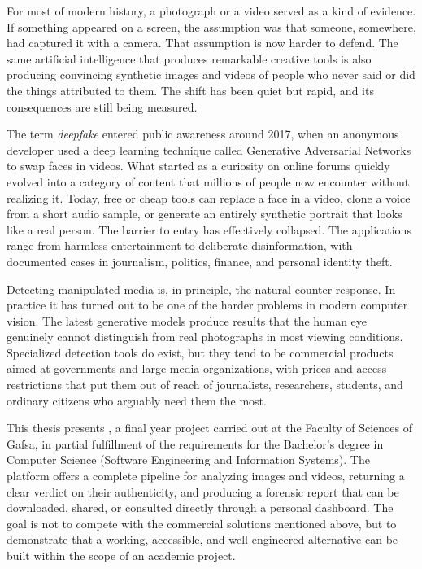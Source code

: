 
For most of modern history, a photograph or a video served as a kind of evidence. If something appeared on a screen, the assumption was that someone, somewhere, had captured it with a camera. That assumption is now harder to defend. The same artificial intelligence that produces remarkable creative tools is also producing convincing synthetic images and videos of people who never said or did the things attributed to them. The shift has been quiet but rapid, and its consequences are still being measured.

The term \textit{deepfake} entered public awareness around 2017, when an anonymous developer used a deep learning technique called Generative Adversarial Networks to swap faces in videos. What started as a curiosity on online forums quickly evolved into a category of content that millions of people now encounter without realizing it. Today, free or cheap tools can replace a face in a video, clone a voice from a short audio sample, or generate an entirely synthetic portrait that looks like a real person. The barrier to entry has effectively collapsed. The applications range from harmless entertainment to deliberate disinformation, with documented cases in journalism, politics, finance, and personal identity theft.

Detecting manipulated media is, in principle, the natural counter-response. In practice it has turned out to be one of the harder problems in modern computer vision. The latest generative models produce results that the human eye genuinely cannot distinguish from real photographs in most viewing conditions. Specialized detection tools do exist, but they tend to be commercial products aimed at governments and large media organizations, with prices and access restrictions that put them out of reach of journalists, researchers, students, and ordinary citizens who arguably need them the most.

This thesis presents \deepguard{}, a final year project carried out at the Faculty of Sciences of Gafsa, in partial fulfillment of the requirements for the Bachelor's degree in Computer Science (Software Engineering and Information Systems). The platform offers a complete pipeline for analyzing images and videos, returning a clear verdict on their authenticity, and producing a forensic report that can be downloaded, shared, or consulted directly through a personal dashboard. The goal is not to compete with the commercial solutions mentioned above, but to demonstrate that a working, accessible, and well-engineered alternative can be built within the scope of an academic project.


